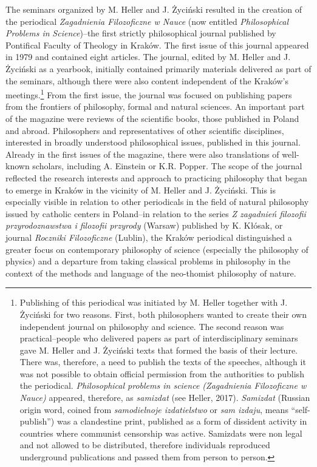 \documentclass[a4paper]{article}
\begin{document}
The seminars organized by M. Heller and J. Życiński resulted in the creation of the periodical \textit{Zagadnienia
Filozoficzne w Nauce} (now entitled \textit{Philosophical Problems in }\textit{Science})–the first strictly
philosophical journal published by Pontifical Faculty of Theology in Kraków. The first issue of this journal appeared
in 1979 and contained eight articles. The journal, edited by M. Heller and J. Życiński as a yearbook, initially
contained primarily materials delivered as part of the seminars, although there were also content independent of the
Kraków’s meetings.\footnote{ Publishing of this periodical was initiated by M. Heller together with J. Życiński for two
reasons. First, both philosophers wanted to create their own independent journal on philosophy and science. The second
reason was practical–people who delivered papers as part of interdisciplinary seminars gave M. Heller and J. Życiński
texts that formed the basis of their lecture. There was, therefore, a need to publish the texts of the speeches,
although it was not possible to obtain official permission from the authorities to publish the periodical.
\textit{Philosophical problems in science (Zagadnienia Filozoficzne w Nauce)} appeared, therefore, as \textit{samizdat}
\label{ref:RND3qsUM2PGth}(see Heller, 2017). \textit{Samizdat} (Russian origin word, coined from \textit{samodielnoje
izdatielstwo} or \textit{sam izdaju}, means “self-publish”) was a clandestine print, published as a form of dissident
activity in countries where communist censorship was active. Samizdats were non legal and not allowed to be
distributed, therefore individuals reproduced underground publications and passed them from person to person. } From
the first issue, the journal was focused on publishing papers from the frontiers of philosophy, formal and natural
sciences. An important part of the magazine were reviews of the scientific books, those published in Poland and abroad.
Philosophers and representatives of other scientific disciplines, interested in broadly understood philosophical
issues, published in this journal. Already in the first issues of the magazine, there were also translations of
well-known scholars, including A. Einstein or K.R. Popper. The scope of the journal reflected the research interests
and approach to practicing philosophy that began to emerge in Kraków in the vicinity of M. Heller and J. Życiński. This
is especially visible in relation to other periodicals in the field of natural philosophy issued by catholic centers in
Poland–in relation to the series \textit{Z zagadnień filozofii przyrodoznawstwa i filozofii przyrody} (Warsaw)
published by K. Kłósak, or journal \textit{Roczniki Filozoficzne }(Lublin), the Kraków periodical distinguished a
greater focus on contemporary philosophy of science (especially the philosophy of physics) and a departure from taking
classical problems in philosophy in the context of the methods and language of the neo-thomist philosophy of nature.
\end{document}
